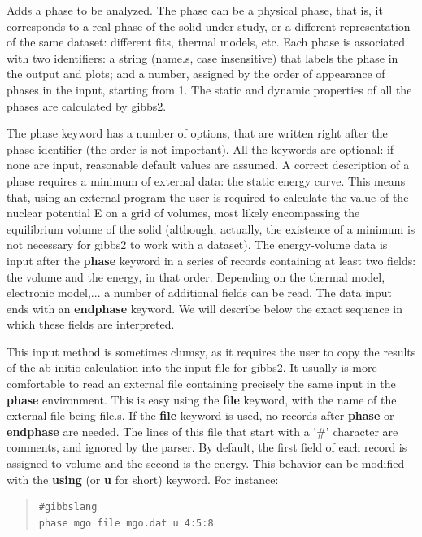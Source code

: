 \documentclass[a4paper]{article}
\begin{document}
Adds a phase to be analyzed. The phase can be a physical phase, that
is, it corresponds to a real phase of the solid under study, or a
different representation of the same dataset: different fits, thermal
models, etc. Each phase is associated with two identifiers: a string
(name.s, case insensitive) that labels the phase in the output and
plots; and a number, assigned by the order of appearance of phases in
the input, starting from 1. The static and dynamic properties of all
the phases are calculated by gibbs2.

The phase keyword has a number of options, that are written right
after the phase identifier (the order is not important). All the
keywords are optional: if none are input, reasonable default values
are assumed. A correct description of a phase requires a minimum of
external data: the static energy curve. This means that, using an
external program the user is required to calculate the value of the
nuclear potential E on a grid of volumes, most likely encompassing the
equilibrium volume of the solid (although, actually, the existence of
a minimum is not necessary for gibbs2 to work with a dataset). The
energy-volume data is input after the \textbf{phase} keyword in a series of
records containing at least two fields: the volume and the energy, in
that order. Depending on the thermal model, electronic model,... a
number of additional fields can be read. The data input ends with an
\textbf{endphase} keyword. We will describe below the exact sequence in
which these fields are interpreted.

This input method is sometimes clumsy, as it requires the user to copy
the results of the ab initio calculation into the input file for
gibbs2. It usually is more comfortable to read an external file
containing precisely the same input in the \textbf{phase} environment. This
is easy using the \textbf{file} keyword, with the name of the external file
being file.s. If the \textbf{file} keyword is used, no records after
\textbf{phase} or \textbf{endphase} are needed. The lines of this file that
start with a '\#' character are comments, and ignored by the
parser. By default, the first field of each record is assigned to
volume and the second is the energy. This behavior can be modified
with the \textbf{using} (or \textbf{u} for short) keyword. For instance:

\begin{quote}
\begin{verbatim}
#gibbslang
phase mgo file mgo.dat u 4:5:8
\end{verbatim}
\end{quote}
\end{document}
